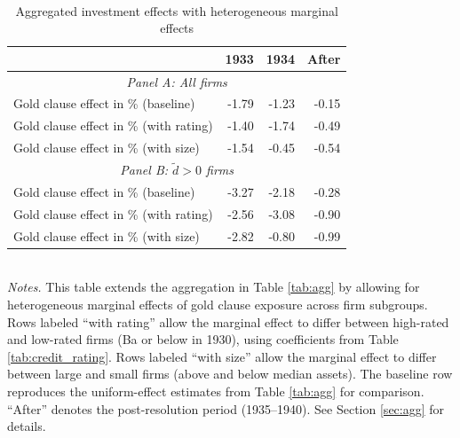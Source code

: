 \begin{table}[p]\centering
    \caption{\\Aggregated investment effects with heterogeneous marginal effects}\footnotesize
    \label{tabapp:agg_het}
    \begin{tabular}{lrrr}
    \toprule
    & 1933 & 1934 & After \\
    \midrule
    \multicolumn{4}{c}{\textit{Panel A: All firms}}\\
    \midrule
    Gold clause effect in \% (baseline)      & -1.79 & -1.23 & -0.15 \\
    Gold clause effect in \% (with rating)   & -1.40 & -1.74 & -0.49 \\
    Gold clause effect in \% (with size)     & -1.54 & -0.45 & -0.54 \\
    \midrule
    \multicolumn{4}{c}{\textit{Panel B: $\tilde{d}>0$ firms}}\\
    \midrule
    Gold clause effect in \% (baseline)      & -3.27 & -2.18 & -0.28 \\
    Gold clause effect in \% (with rating)   & -2.56 & -3.08 & -0.90 \\
    Gold clause effect in \% (with size)     & -2.82 & -0.80 & -0.99 \\
    \bottomrule
    
    \end{tabular}\\
    
    \vspace*{3mm} \justifying \noindent
    \footnotesize{\textit{Notes.} This table extends the aggregation in Table \ref{tab:agg} by allowing for heterogeneous marginal effects of gold clause exposure across firm subgroups. Rows labeled ``with rating'' allow the marginal effect to differ between high-rated and low-rated firms (Ba or below in 1930), using coefficients from Table \ref{tab:credit_rating}. Rows labeled ``with size'' allow the marginal effect to differ between large and small firms (above and below median assets). The baseline row reproduces the uniform-effect estimates from Table \ref{tab:agg} for comparison. ``After'' denotes the post-resolution period (1935--1940). See Section \ref{sec:agg} for details.}
\end{table}
